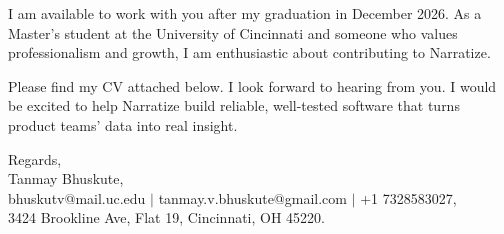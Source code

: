 \documentclass[11pt]{letter}
\begin{document}
\begin{letter}{}
I am available to work with you after my graduation in December 2026. As a Master's student at the University of Cincinnati and someone who values professionalism and growth, I am enthusiastic about contributing to Narratize.

Please find my CV attached below. I look forward to hearing from you. I would be excited to help Narratize build reliable, well-tested software that turns product teams' data into real insight.

{\setlength{\parskip}{0pt}
Regards,\\
Tanmay Bhuskute,\\
bhuskutv@mail.uc.edu $\mid$ tanmay.v.bhuskute@gmail.com $\mid$ +1 7328583027,\\
3424 Brookline Ave, Flat 19, Cincinnati, OH 45220.
}

\end{letter}
\end{document}
